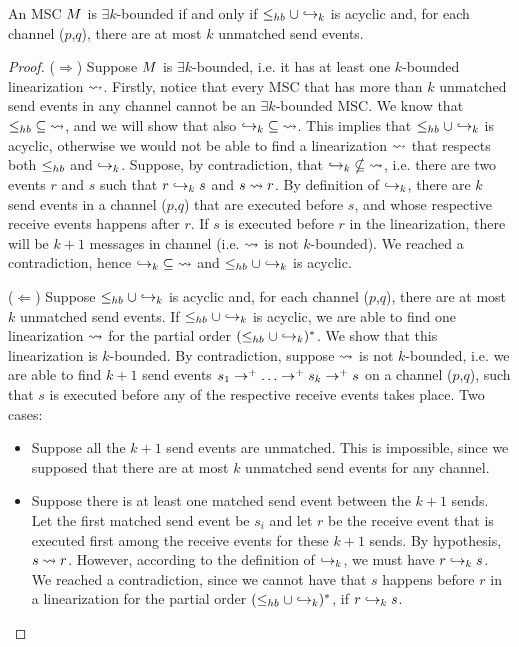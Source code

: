 \begin{proposition}\label{prop:asy_ek_def_alt}
	An MSC $M$ is $\exists k$-bounded if and only if $\leq_{hb} \cup \hookrightarrow_{k}$ is acyclic and, for each channel ($p$,$q$), there are at most $k$ unmatched send events.
\end{proposition}
\begin{proof}
	($\Rightarrow$) Suppose $M$ is $\exists k$-bounded, i.e. it has at least one $k$-bounded linearization $\rightsquigarrow$. Firstly, notice that every MSC that has more than $k$ unmatched send events in any channel cannot be an $\exists k$-bounded MSC. We know that $\leq_{hb} \;\subseteq\; \rightsquigarrow$, and we will show  that also $\hookrightarrow_{k} \;\subseteq\; \rightsquigarrow$. This implies that $\leq_{hb} \cup \hookrightarrow_{k}$ is acyclic, otherwise we would not be able to find a linearization $\rightsquigarrow$ that respects both $\leq_{hb}$ and $\hookrightarrow_{k}$. Suppose, by contradiction, that $\hookrightarrow_{k} \;\nsubseteq\; \rightsquigarrow$, i.e. there are two events $r$ and $s$ such that $r \hookrightarrow_{k} s$ and $s \rightsquigarrow r$. By definition of $\hookrightarrow_{k}$, there are $k$ send events in a channel ($p$,$q$) that are executed before $s$, and whose respective receive events happens after $r$. If $s$ is executed before $r$ in the linearization, there will be $k+1$ messages in channel (i.e. $\rightsquigarrow$ is not $k$-bounded). We reached a contradiction, hence $\hookrightarrow_{k} \;\subseteq\; \rightsquigarrow$ and $\leq_{hb} \cup \hookrightarrow_{k}$ is acyclic.
	
	($\Leftarrow$) Suppose $\leq_{hb} \cup \hookrightarrow_{k}$ is acyclic and, for each channel ($p$,$q$), there are at most $k$ unmatched send events. If $\leq_{hb} \cup \hookrightarrow_{k}$ is acyclic, we are able to find one linearization $\rightsquigarrow$ for the partial order $(\leq_{hb} \cup \hookrightarrow_{k})^\ast$. We show that this linearization is $k$-bounded. By contradiction, suppose $\rightsquigarrow$ is not $k$-bounded, i.e. we are able to find $k+1$ send events $s_1 \procrel^+ \dots \procrel^+ s_k \procrel^+ s$ on a channel ($p$,$q$), such that $s$ is executed before any of the respective receive events takes place. Two cases:
	\begin{itemize}
		\item Suppose all the $k+1$ send events are unmatched. This is impossible, since we supposed that there are at most $k$ unmatched send events for any channel.
		\item Suppose there is at least one matched send event between the $k+1$ sends. Let the first matched send event be $s_i$ and let $r$ be the receive event that is executed first among the receive events for these $k+1$ sends. By hypothesis, $s \rightsquigarrow r$. However, according to the definition of $\hookrightarrow_{k}$, we must have $r \hookrightarrow_{k} s$. We reached a contradiction, since we cannot have that $s$ happens before $r$ in a linearization for the partial order $(\leq_{hb} \cup \hookrightarrow_{k})^\ast$, if $r \hookrightarrow_{k} s$.
	\end{itemize}
\end{proof}

